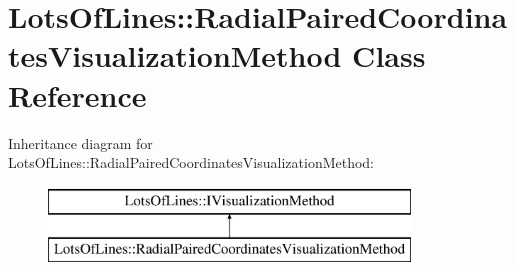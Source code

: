 \hypertarget{class_lots_of_lines_1_1_radial_paired_coordinates_visualization_method}{}\section{Lots\+Of\+Lines\+:\+:Radial\+Paired\+Coordinates\+Visualization\+Method Class Reference}
\label{class_lots_of_lines_1_1_radial_paired_coordinates_visualization_method}
Inheritance diagram for Lots\+Of\+Lines\+:\+:Radial\+Paired\+Coordinates\+Visualization\+Method\+:\begin{figure}[H]
\begin{center}
\leavevmode
\includegraphics[height=2.000000cm]{class_lots_of_lines_1_1_radial_paired_coordinates_visualization_method}
\end{center}
\end{figure}
